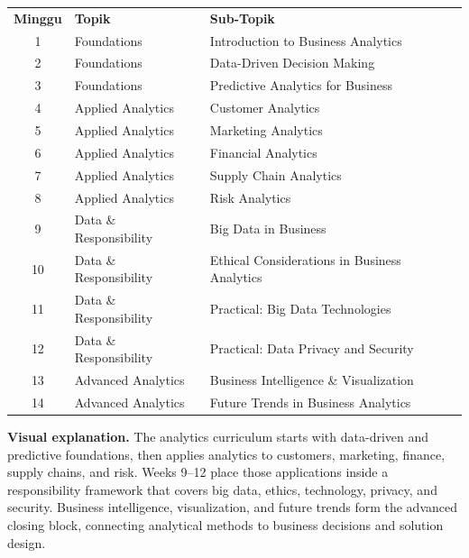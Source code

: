 \documentclass[10pt]{article}
\newcommand{\visualexplanation}[1]{%
  \begin{tcolorbox}[colback=lightgray,colframe=navy!35,boxrule=0.5pt,
    arc=2mm,left=2mm,right=2mm,top=1.5mm,bottom=1.5mm]
  \textbf{Visual explanation.} #1
  \end{tcolorbox}}
\begin{document}
\begin{center}\small
\begin{tabularx}{\textwidth}{c L{5.0cm} Y}
\color{white}\bfseries Minggu & \color{white}\bfseries Topik & \color{white}\bfseries Sub-Topik\\
1 & Foundations & Introduction to Business Analytics\\
2 & Foundations & Data-Driven Decision Making\\
3 & Foundations & Predictive Analytics for Business\\
4 & Applied Analytics & Customer Analytics\\
5 & Applied Analytics & Marketing Analytics\\
6 & Applied Analytics & Financial Analytics\\
7 & Applied Analytics & Supply Chain Analytics\\
8 & Applied Analytics & Risk Analytics\\
9 & Data \& Responsibility & Big Data in Business\\
10 & Data \& Responsibility & Ethical Considerations in Business Analytics\\
11 & Data \& Responsibility & Practical: Big Data Technologies\\
12 & Data \& Responsibility & Practical: Data Privacy and Security\\
13 & Advanced Analytics & Business Intelligence \& Visualization\\
14 & Advanced Analytics & Future Trends in Business Analytics\\
\end{tabularx}
\end{center}

\visualexplanation{The analytics curriculum starts with data-driven and predictive foundations, then applies analytics to customers, marketing, finance, supply chains, and risk. Weeks 9--12 place those applications inside a responsibility framework that covers big data, ethics, technology, privacy, and security. Business intelligence, visualization, and future trends form the advanced closing block, connecting analytical methods to business decisions and solution design.}
\end{document}
